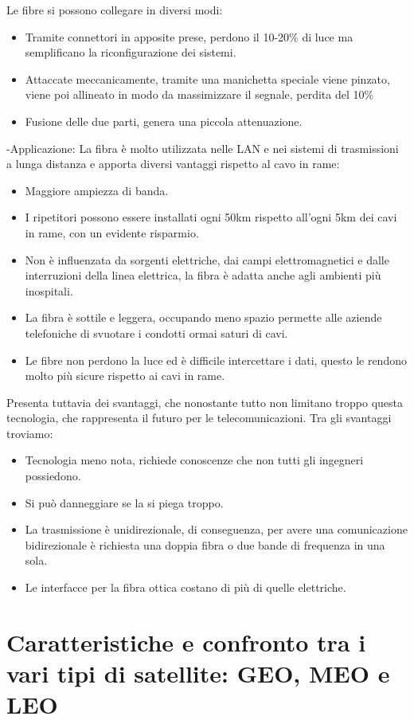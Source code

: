 Le fibre si possono collegare in diversi modi:
\begin{itemize}
\item Tramite connettori in apposite prese, perdono il 10-20\% di luce ma semplificano la riconfigurazione dei sistemi. 
\item Attaccate meccanicamente, tramite una manichetta speciale viene pinzato, viene poi allineato in modo da massimizzare il segnale, perdita del 10\% 
\item Fusione delle due parti, genera una piccola attenuazione.
\end{itemize}
-Applicazione: La fibra è molto utilizzata nelle LAN e nei sistemi di trasmissioni a lunga distanza e apporta diversi vantaggi rispetto al cavo in rame:
\begin{itemize}
\item	Maggiore ampiezza di banda.
\item	I ripetitori possono essere installati ogni 50km rispetto all’ogni 5km dei cavi in rame, con un evidente risparmio.
\item	Non è influenzata da sorgenti elettriche, dai campi elettromagnetici e dalle interruzioni della linea elettrica, la fibra è adatta anche agli ambienti più inospitali.
\item	La fibra è sottile e leggera, occupando meno spazio permette alle aziende telefoniche di svuotare i condotti ormai saturi di cavi.
\item	Le fibre non perdono la luce ed è difficile intercettare i dati, questo le rendono molto più sicure rispetto ai cavi in rame.
\end{itemize}
Presenta tuttavia dei svantaggi, che nonostante tutto non limitano troppo questa tecnologia, che rappresenta il futuro per le telecomunicazioni. Tra gli svantaggi troviamo:
\begin{itemize}
\item	Tecnologia meno nota, richiede conoscenze che non tutti gli ingegneri possiedono.
\item	Si può danneggiare se la si piega troppo.
\item	La trasmissione è unidirezionale, di conseguenza, per avere una comunicazione bidirezionale è richiesta una doppia fibra o due bande di frequenza in una sola.
\item	Le interfacce per la fibra ottica costano di più di quelle elettriche.
\end{itemize}


\section{Caratteristiche e confronto tra i vari tipi di satellite: GEO, MEO e LEO}


